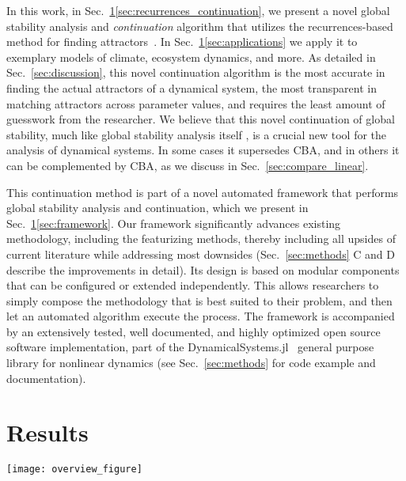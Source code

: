\documentclass[%
 aip,
 amsmath,amssymb,
 reprint,%
]{revtex4-1}
\begin{document}
In this work, in Sec.~\ref{sec:results}\ref{sec:recurrences_continuation}, we present a novel global stability analysis and \emph{continuation} algorithm that utilizes the recurrences-based method for finding attractors~\cite{DatserisWagemakers2022}. In Sec.~\ref{sec:results}\ref{sec:applications} we apply it to exemplary models of climate, ecosystem dynamics, and more. As detailed in Sec.~\ref{sec:discussion}, this novel continuation algorithm is the most accurate in finding the actual attractors of a dynamical system, the most transparent in matching attractors across parameter values, and requires the least amount of guesswork from the researcher. 
We believe that this novel continuation of global stability, much like global stability analysis itself \cite{Menck2013}, is a crucial new tool for the analysis of dynamical systems. In some cases it supersedes CBA, and in others it can be complemented by CBA, as we discuss in Sec.~\ref{sec:compare_linear}.

This continuation method is part of a novel automated framework that performs global stability analysis and continuation, which we present in Sec.~\ref{sec:results}\ref{sec:framework}. Our framework significantly advances existing methodology, including the featurizing methods, thereby including all upsides of current literature while addressing most downsides (Sec.~\ref{sec:methods} C and D describe the improvements in detail). Its design is based on modular components that can be configured or extended independently. This allows researchers to simply compose the methodology that is best suited to their problem, and then let an automated algorithm execute the process. The framework is accompanied by an extensively tested, well documented, and highly optimized open source software implementation, part of the DynamicalSystems.jl~\cite{DynamicalSystems.jl} general purpose library for nonlinear dynamics (see Sec.~\ref{sec:methods} for code example and documentation). 

\section{Results}
\label{sec:results}

\begin{figure*}[!t]
\centering 
\texttt{[image: overview\_figure]}
\caption{\textbf{A}: The recurrences-based find-and-match (RAFM) algorithm for global stability continuation described in Sec.~\ref{sec:results}\ref{sec:recurrences_continuation}.
\textbf{B}: Schematic illustration of the modular framework for global stability analysis and continuation described in Sec.~\ref{sec:results}\ref{sec:framework}.}
\label{fig:continuation_algorithm}
\end{figure*}
\end{document}
